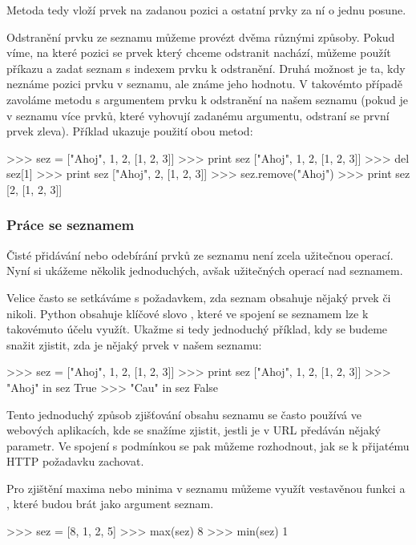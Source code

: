 Metoda  tedy vloží prvek na zadanou pozici a ostatní prvky za ní o jednu posune.

Odstranění prvku ze seznamu můžeme provézt dvěma různými způsoby. Pokud víme, na které pozici se prvek který chceme odstranit nachází, můžeme použít příkazu  a zadat seznam s indexem prvku k odstranění. Druhá možnost je ta, kdy neznáme pozici prvku v seznamu, ale známe jeho hodnotu. V takovémto případě zavoláme metodu  s argumentem prvku k odstranění na našem seznamu (pokud je v seznamu více prvků, které vyhovují zadanému argumentu, odstraní se první prvek zleva). Příklad ukazuje použití obou metod:

\begin{python}
>>> sez = ["Ahoj", 1, 2, [1, 2, 3]]
>>> print sez
["Ahoj", 1, 2, [1, 2, 3]]
>>> del sez[1]
>>> print sez
["Ahoj", 2, [1, 2, 3]]
>>> sez.remove("Ahoj")
>>> print sez
[2, [1, 2, 3]]
\end{python}

\subsubsection{Práce se seznamem}
Čisté přidávání nebo odebírání prvků ze seznamu není zcela užitečnou operací. Nyní si ukážeme několik jednoduchých, avšak užitečných operací nad seznamem.

Velice často se setkáváme s požadavkem, zda seznam obsahuje nějaký prvek či nikoli. Python obsahuje klíčové slovo , které ve spojení se seznamem lze k takovémuto účelu využít. Ukažme si tedy jednoduchý pří\-kla\-d, kdy se budeme snažit zjistit, zda je nějaký prvek v našem seznamu:

\begin{python}
>>> sez = ["Ahoj", 1, 2, [1, 2, 3]]
>>> print sez
["Ahoj", 1, 2, [1, 2, 3]]
>>> "Ahoj" in sez
True
>>> "Cau" in sez
False
\end{python}

Tento jednoduchý způsob zjišťování obsahu seznamu se často používá ve webových aplikacích, kde se snažíme zjistit, jestli je v URL předáván nějaký parametr. Ve spojení s podmínkou  se pak můžeme rozhodnout, jak se k přijatému HTTP požadavku zachovat.

Pro zjištění maxima nebo minima v seznamu můžeme využít vestavěnou funkci  a , které budou brát jako argument seznam.

\begin{python}
>>> sez = [8, 1, 2, 5]
>>> max(sez)
8
>>> min(sez)
1
\end{python}


